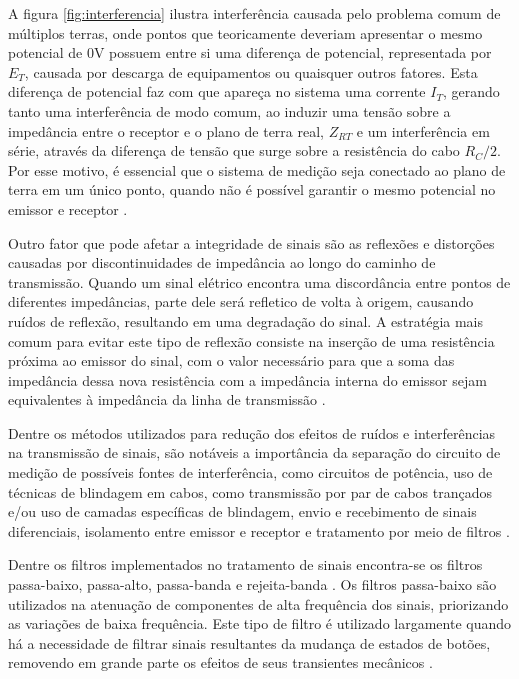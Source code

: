 A figura \ref{fig:interferencia} ilustra interferência causada pelo
problema comum de múltiplos terras, onde pontos que teoricamente deveriam
apresentar o mesmo potencial de 0V possuem entre si uma diferença de 
potencial, representada por $E_T$, causada por descarga de equipamentos ou quaisquer 
outros fatores. Esta diferença de potencial faz com que apareça no sistema 
uma corrente $I_T$, gerando tanto uma interferência de modo comum, ao 
induzir uma tensão sobre a impedância entre o receptor e o plano de terra
real, $Z_{RT}$ e um interferência em série, através da diferença de 
tensão que surge sobre a resistência do cabo $R_C/2$. Por esse motivo, é 
essencial que o sistema de medição seja conectado ao plano de terra em 
um único ponto, quando não é possível garantir o mesmo potencial no 
emissor e receptor \cite{bentley2005principles}.

Outro fator que pode afetar a integridade de sinais são as reflexões 
e distorções causadas por discontinuidades de impedância ao longo do 
caminho de transmissão. 
Quando um sinal elétrico encontra uma discordância entre pontos de 
diferentes impedâncias, parte dele será refletico de volta à origem,
causando ruídos de reflexão, resultando em uma degradação do sinal. 
A estratégia mais comum para evitar este tipo de reflexão consiste
na inserção de uma resistência próxima ao emissor do sinal, com o valor
necessário para que a soma das impedância dessa nova resistência com a
impedância interna do emissor sejam equivalentes à impedância da linha
de transmissão \cite{bogatin2010signal}. 

Dentre os métodos utilizados para redução dos efeitos de ruídos e 
interferências na transmissão de sinais, são notáveis a importância da
separação do circuito de medição de possíveis fontes de interferência,
como circuitos de potência, uso de técnicas de blindagem em cabos, como
transmissão por par de cabos trançados e/ou uso de camadas específicas de
blindagem, envio e recebimento de sinais diferenciais, isolamento entre
emissor e receptor e tratamento por meio de filtros \cite{bentley2005principles}.

Dentre os filtros implementados no tratamento de sinais encontra-se os
filtros passa-baixo, passa-alto, passa-banda e rejeita-banda \cite{irwin2010basic}. 
Os filtros passa-baixo são utilizados na atenuação de componentes de alta
frequência dos sinais, priorizando as variações de baixa frequência.
Este tipo de filtro é utilizado largamente quando há a necessidade de
filtrar sinais resultantes da mudança de estados de botões, removendo
em grande parte os efeitos de seus transientes mecânicos \cite{ganssle2004guide}.

